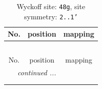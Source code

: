 \documentclass[fleqn,8pt]{jsarticle}
\begin{document}
\renewcommand{\arraystretch}{1.2}
\begin{longtable}{ccc}
\caption{Wyckoff site: {\tt 48g}, site symmetry: {\tt 2..1'}}
 \\
 \hline \hline
No. & position & mapping \\ \hline \endfirsthead

\multicolumn{2}{l}{\tablename\ \thetable{}} \\
 \hline \hline
No. & position & mapping \\ \hline \endhead

 \hline \hline
\multicolumn{2}{r}{\footnotesize\it continued ...} \\ \endfoot

 \hline \hline
\multicolumn{2}{r}{} \\ \endlastfoot


\end{longtable}
\end{document}

